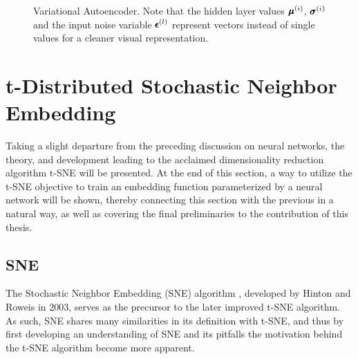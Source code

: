 

\begin{figure}[!htb]
  \centering
  \resizebox{0.8\textwidth}{!}{\unskip}
  \caption{Variational Autoencoder. Note that the hidden layer values $\pmb{\mu}^{(i)}$, $\pmb{\sigma}^{(i)}$ and the input noise variable $\pmb{\epsilon}^{(l)}$ represent vectors instead of single values for a cleaner visual representation.}
  \label{fig:vae}
\end{figure}

\section{t-Distributed Stochastic Neighbor Embedding}
\label{section:tsne}

Taking a slight departure from the preceding discussion on neural networks, the theory, and development leading to the acclaimed dimensionality reduction algorithm t-SNE will be presented. At the end of this section, a way to utilize the t-SNE objective to train an embedding function parameterized by a neural network will be shown, thereby connecting this section with the previous in a natural way, as well as covering the final preliminaries to the contribution of this thesis.

\subsection{SNE}
\label{subsection:sne}

The Stochastic Neighbor Embedding (SNE) algorithm \cite{sne}, developed by Hinton and Roweis in 2003, serves as the precursor to the later improved t-SNE algorithm. As such, SNE shares many similarities in its definition with t-SNE, and thus by first developing an understanding of SNE and its pitfalls the motivation behind the t-SNE algorithm become more apparent.

